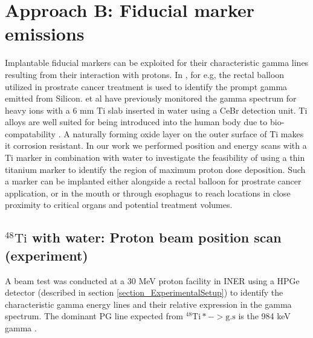 \documentclass[11pt,a4paper]{article}
\begin{document}
\section{Approach B: Fiducial marker emissions\label{FiducialMarker}} 
\label{section_FM}

Implantable fiducial markers can be exploited for their characteristic gamma lines resulting from their interaction with protons. In \cite{Freitas2021}, for e.g, the rectal balloon utilized in prostrate cancer treatment is used to identify the  prompt gamma emitted from Silicon. \cite{Bello2020} et al have previously monitored the gamma spectrum for  heavy ions with a 6 mm Ti slab inserted in water using a CeBr detection unit. Ti alloys are well suited for being introduced into the human body due to bio-compatability \cite{Elias2014}. A naturally forming oxide layer on the outer surface of Ti makes it corrosion resistant. In our work we performed position and energy scans with a Ti marker in combination with water to investigate the feasibility of using a thin titanium marker to identify the region of maximum proton dose deposition. Such a marker can be implanted either alongside a rectal balloon for prostrate cancer application, or in the mouth or  through esophagus to reach locations in close proximity to critical organs and potential treatment volumes. 

\subsection{$\mathrm{^{48}Ti}$ with water: Proton beam position scan (experiment) }
A beam test was conducted at a 30 MeV proton facility in INER using a HPGe detector (described in section \ref{section_ExperimentalSetup})  to identify the characteristic gamma energy lines and their relative expression in the gamma spectrum.  The dominant PG line expected from $\mathrm{^{48}Ti*->g.s}$ is the 984 keV gamma \cite{Kozlovsky2002}. 
\end{document}
